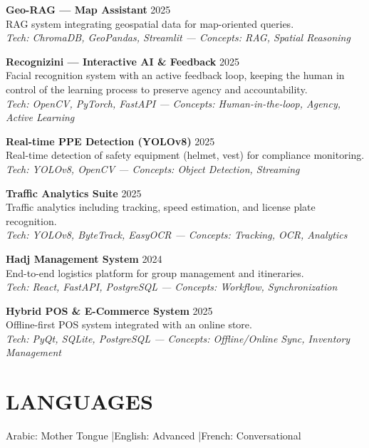 \documentclass[a4paper,12pt]{article}
\begin{document}
{\textbf{Geo-RAG — Map Assistant} \hfill 2025 \\
RAG system integrating geospatial data for map-oriented queries. \\
\textit{Tech: ChromaDB, GeoPandas, Streamlit — Concepts: RAG, Spatial Reasoning}

\textbf{Recognizini — Interactive AI \& Feedback} \hfill 2025 \\
Facial recognition system with an active feedback loop, keeping the human in control of the learning process to preserve agency and accountability. \\
\textit{Tech: OpenCV, PyTorch, FastAPI — Concepts: Human-in-the-loop, Agency, Active Learning}

\textbf{Real-time PPE Detection (YOLOv8)} \hfill 2025 \\
Real-time detection of safety equipment (helmet, vest) for compliance monitoring. \\
\textit{Tech: YOLOv8, OpenCV — Concepts: Object Detection, Streaming}

\textbf{Traffic Analytics Suite} \hfill 2025 \\
Traffic analytics including tracking, speed estimation, and license plate recognition. \\
\textit{Tech: YOLOv8, ByteTrack, EasyOCR — Concepts: Tracking, OCR, Analytics}

\textbf{Hadj Management System} \hfill 2024 \\
End-to-end logistics platform for group management and itineraries. \\
\textit{Tech: React, FastAPI, PostgreSQL — Concepts: Workflow, Synchronization}

\textbf{Hybrid POS \& E-Commerce System} \hfill 2025 \\
Offline-first POS system integrated with an online store. \\
\textit{Tech: PyQt, SQLite, PostgreSQL — Concepts: Offline/Online Sync, Inventory Management}

} %

\section{LANGUAGES}
Arabic: Mother Tongue \quad|\quad English: Advanced \quad|\quad French: Conversational
\end{document}
